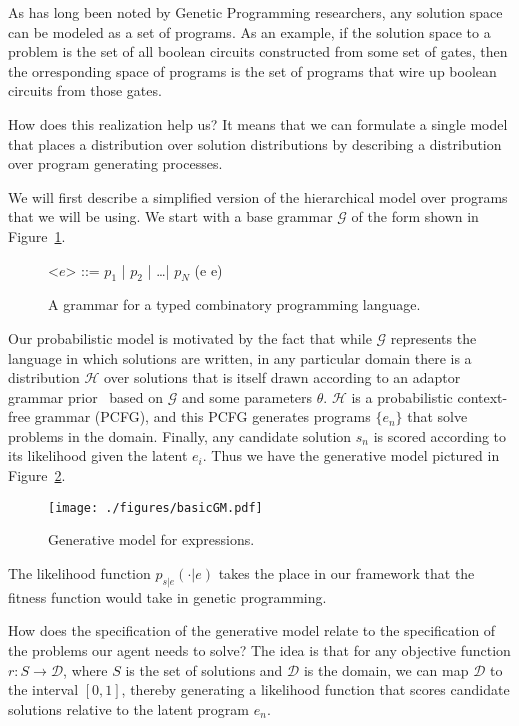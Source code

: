 \documentclass{article}
\begin{document}
As has long been noted by Genetic Programming researchers, any solution space
can be modeled as a set of programs. As an example, if the solution space to a
problem is the set of all boolean circuits constructed from some set of gates,
then the orresponding space of programs is the set of programs that wire up
boolean circuits from those gates. 

How does this realization help us? It means that we can formulate a single
model that places a distribution over solution distributions by describing a
distribution over program generating processes.

We will first describe a simplified version of the hierarchical model over
programs that we will be using. We start with a base grammar $\mathcal{G}$ of
the form shown in Figure~\ref{fig:grammar}. 

\begin{figure}
  \begin{grammar}
    <$e$> ::= $p_1$ | $p_2$ | \dots | $p_N$   
              \alt (e e) 
  \end{grammar}
 \caption{A grammar for a typed combinatory programming language.\label{fig:grammar}}
\end{figure}

Our probabilistic model is motivated by the fact that while $\mathcal{G}$
represents the language in which solutions are written, in any particular
domain there is a distribution $\mathcal{H}$ over solutions that is itself drawn
according to an adaptor grammar prior~\cite{} based on $\mathcal{G}$ and some
parameters $\theta$. $\mathcal{H}$ is a probabilistic context-free grammar
(PCFG), and this PCFG generates programs $\{e_n\}$ that solve problems in the
domain. Finally, any candidate solution $s_n$ is scored according to its
likelihood given the latent $e_i$. Thus we have the generative model pictured in
Figure~\ref{fig:generativeModel}.

\begin{figure}[h] 
  \texttt{[image: ./figures/basicGM.pdf]}  
  \caption{Generative model for expressions.\label{fig:generativeModel}}  
\end{figure}

The likelihood function $p_{s|e}(\cdot | e)$ takes the place in our framework that the fitness function would take in genetic programming. 

How does the specification of the generative model relate to the specification
of the problems our agent needs to solve? The idea is that for any objective
function $ r:S \rightarrow \mathcal{D}$, where $S$ is the set of solutions and
$\mathcal{D}$ is the domain, we can map $\mathcal{D}$ to the interval $[0,1]$,
thereby generating a likelihood function that scores candidate solutions
relative to the latent program $e_n$.   
\end{document}
